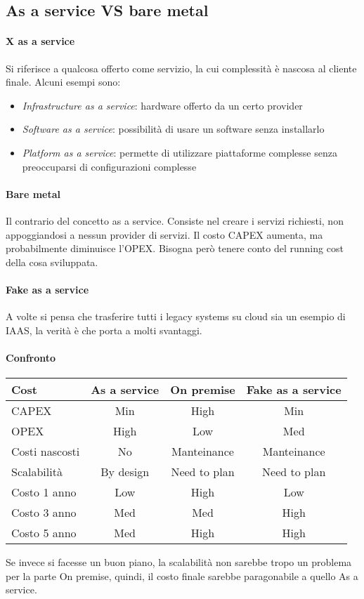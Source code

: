 \subsection{As a service VS bare metal}

\paragraph{X as a service}
Si riferisce a qualcosa offerto come servizio, la cui complessità è nascosa al 
cliente finale.
Alcuni esempi sono:
\begin{itemize}
    \item \emph{Infrastructure as a service}: hardware offerto da un certo provider
    \item \emph{Software as a service}: possibilità di usare un software senza installarlo
    \item \emph{Platform as a service}: permette di utilizzare piattaforme complesse
    senza preoccuparsi di configurazioni complesse
\end{itemize}

\paragraph{Bare metal}
Il contrario del concetto as a service. Consiste nel creare i servizi richiesti, 
non appoggiandosi a nessun provider di servizi. 
Il costo CAPEX aumenta, ma probabilmente diminuisce l'OPEX. Bisogna però tenere conto
del running cost della cosa sviluppata.

\paragraph{Fake as a service}
A volte si pensa che trasferire tutti i legacy systems su cloud sia un esempio di 
IAAS, la verità è che porta a molti svantaggi.

\paragraph{Confronto}
\begin{center}
    \begin{tabular}{lccc} 
    \toprule
        Cost & As a service & On premise & Fake as a service \\
    \midrule
        CAPEX & Min& High& Min\\ 
        OPEX & High &  Low & Med\\
        Costi nascosti  & No & Manteinance & Manteinance\\
        Scalabilità &  By design & Need to plan & Need to plan\\
        Costo 1 anno &  Low & High & Low\\
        Costo 3 anno &  Med & Med & High\\
        Costo 5 anno &  Med & High & High\\
    \bottomrule
   \end{tabular}
\end{center}
Se invece si facesse un buon piano, la scalabilità non sarebbe tropo un problema per
la parte On premise, quindi, il costo finale sarebbe paragonabile a quello As a service.

